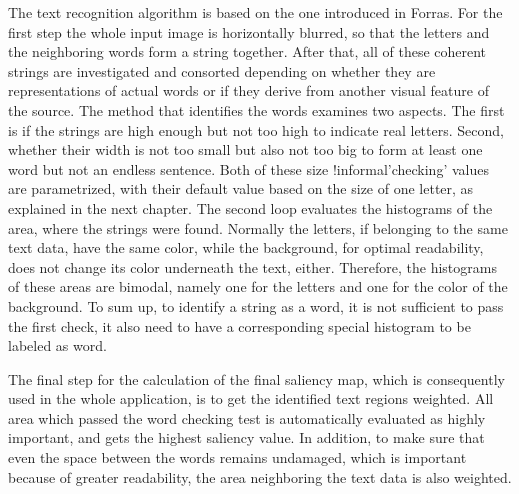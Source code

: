 \documentclass[draft,final]{vutinfth} %
\begin{document}
	The text recognition algorithm is based on the one introduced in Forras.
	For the first step the whole input image is horizontally blurred, so that the letters and the neighboring words form a string together.
	After that, all of these coherent strings are investigated and consorted depending on whether they are representations of actual words or if they derive from another visual feature of the source.
	The method that identifies the words examines two aspects.
	The first is if the strings are high enough but not too high to indicate real letters.
	Second, whether their width is not too small but also not too big to form at least one word but not an endless sentence.
	Both of these size !informal'checking' values are parametrized, with their default value based on the size of one letter, as explained in the next chapter. 
	The second loop evaluates the histograms of the area, where the strings were found.
	Normally the letters, if belonging to the same text data, have the same color, while the background, for optimal readability, does not change its color underneath the text, either.
	Therefore, the histograms of these areas are bimodal, namely one for the letters and one for the color of the background.
	To sum up, to identify a string as a word, it is not sufficient to pass the first check, it  also need  to have a corresponding special histogram to be labeled as word. \par 
	The final step for the calculation of the final saliency map, which is consequently used in the whole application, is to get the identified text regions weighted. 
	All area which passed the word checking test is automatically evaluated as highly important, and gets the highest saliency value.
	In addition, to make sure that even the space between the words remains undamaged, which is important because of greater readability, the area neighboring the text data is also weighted.
	
\end{document}
